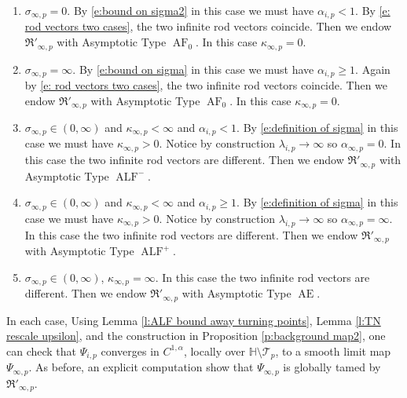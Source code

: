 \documentclass[a4paper,11pt]{amsart}
\theoremstyle{definition}
\numberwithin{equation}{section}
\newcommand{\dH}{\mathbb{H}}
\newcommand{\mR} {\mathfrak R}
\DeclareMathOperator{\Ae}{AE}
\DeclareMathOperator{\ALF}{ALF}
\DeclareMathOperator{\AF}{AF}
\begin{document}
\begin{enumerate}
    \item $\sigma_{\infty, p}=0$. By \eqref{e:bound on sigma2} in this case we must have $\alpha_{i, p}<1$. By \eqref{e: rod vectors two cases}, the two infinite rod vectors coincide. Then we endow $\mR'_{\infty, p}$ with Asymptotic Type $\AF_0$. In this case $\kappa_{\infty,p}=0$.
    \item $\sigma_{\infty, p}=\infty$. By \eqref{e:bound on sigma} in this case we must have $\alpha_{i, p}\geq 1$. Again by \eqref{e: rod vectors two cases}, the two infinite rod vectors coincide. Then we endow $\mR'_{\infty, p}$ with Asymptotic Type $\AF_0$. In this case $\kappa_{\infty,p}=0$.
    \item $\sigma_{\infty, p}\in (0, \infty)$ and $\kappa_{\infty, p}<\infty$ and $\alpha_{i, p}<1$. By \eqref{e:definition of sigma} in this case we must have $\kappa_{\infty,p}>0$. Notice by construction $\lambda_{i, p}\rightarrow\infty$ so $\alpha_{\infty, p}=0$.  In this case  the two infinite rod vectors are different. Then we endow $\mR'_{\infty, p}$ with Asymptotic Type $\ALF^-$. 
     \item $\sigma_{\infty, p}\in (0, \infty)$ and $\kappa_{\infty, p}<\infty$ and $\alpha_{i, p}\geq 1$. By \eqref{e:definition of sigma} in this case we must have $\kappa_{\infty,p}>0$. Notice by construction $\lambda_{i, p}\rightarrow\infty$ so $\alpha_{\infty, p}=\infty$.  In this case  the two infinite rod vectors are different. Then we endow $\mR'_{\infty, p}$ with Asymptotic Type $\ALF^+$.  
    \item $\sigma_{\infty, p}\in (0, \infty)$,  $\kappa_{\infty, p}=\infty$.  In this case the two infinite rod vectors are different. Then we endow $\mR'_{\infty, p}$ with  Asymptotic Type  $\Ae$.  
       
\end{enumerate}
  In each case, Using Lemma \ref{l:ALF bound away turning points}, Lemma \ref{l:TN rescale upsilon}, and the construction in Proposition \ref{p:background map2}, one can check that $\Psi_{i, p}$ converges in $C^{1, \alpha}$, locally over $\dH\setminus \mathcal T_{p}$, to a smooth limit map $\Psi_{\infty, p}$. As before, an explicit computation show that $\Psi_{\infty, p}$  is globally tamed by $\mR'_{\infty, p}$.
  
\end{document}
